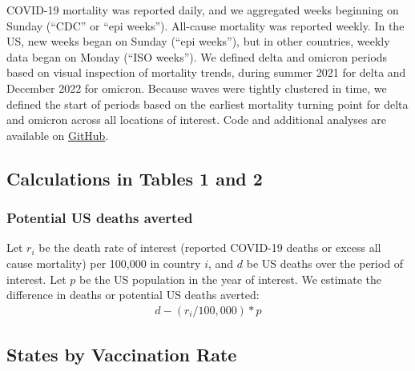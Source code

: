 \documentclass[
]{article}
\begin{document}
COVID-19 mortality was reported daily, and we aggregated weeks beginning
on Sunday (``CDC'' or ``epi weeks''). All-cause mortality was reported
weekly. In the US, new weeks began on Sunday (``epi weeks''), but in
other countries, weekly data began on Monday (``ISO weeks''). We defined
delta and omicron periods based on visual inspection of mortality
trends, during summer 2021 for delta and December 2022 for omicron.
Because waves were tightly clustered in time, we defined the start of
periods based on the earliest mortality turning point for delta and
omicron across all locations of interest. Code and additional analyses
are available on
\href{https://github.com/abilinski/ExcessMortalityDeltaOmicron}{GitHub}.

\bigskip

\hypertarget{calculations-in-tables-1-and-2}{%
\subsection{Calculations in Tables 1 and
2}\label{calculations-in-tables-1-and-2}}

\hypertarget{potential-us-deaths-averted}{%
\subsubsection{Potential US deaths
averted}\label{potential-us-deaths-averted}}

Let \(r_i\) be the death rate of interest (reported COVID-19 deaths or
excess all cause mortality) per 100,000 in country \(i\), and \(d\) be
US deaths over the period of interest. Let \(p\) be the US population in
the year of interest. We estimate the difference in deaths or potential
US deaths averted: \begin{align*}
d - \left(r_i/100,000\right)*p
\end{align*}

\newpage

\hypertarget{states-by-vaccination-rate}{%
\subsection{States by Vaccination
Rate}\label{states-by-vaccination-rate}}
\end{document}
